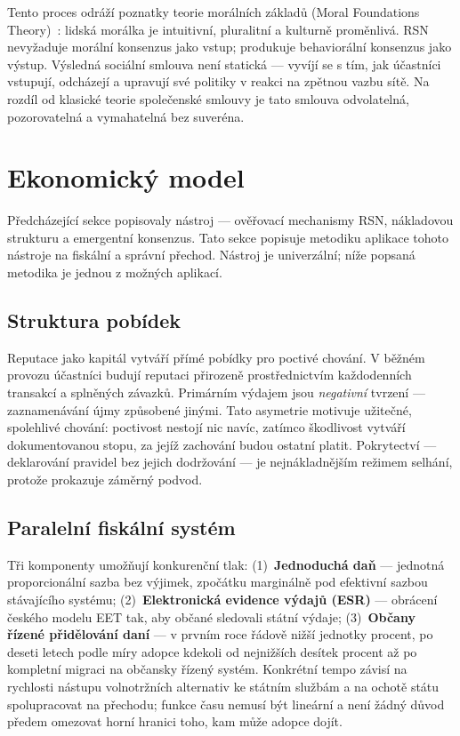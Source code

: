 \documentclass[11pt,a4paper,twocolumn]{article}
\begin{document}
Tento proces odráží poznatky teorie morálních základů (Moral Foundations Theory)~\cite{haidt2012}: lidská morálka je intuitivní, pluralitní a kulturně proměnlivá. RSN nevyžaduje morální konsenzus jako vstup; produkuje behaviorální konsenzus jako výstup. Výsledná sociální smlouva není statická --- vyvíjí se s tím, jak účastníci vstupují, odcházejí a upravují své politiky v reakci na zpětnou vazbu sítě. Na rozdíl od klasické teorie společenské smlouvy je tato smlouva odvolatelná, pozorovatelná a vymahatelná bez suveréna.

\section{Ekonomický model}

Předcházející sekce popisovaly nástroj --- ověřovací mechanismy RSN, nákladovou strukturu a emergentní konsenzus. Tato sekce popisuje metodiku aplikace tohoto nástroje na fiskální a správní přechod. Nástroj je univerzální; níže popsaná metodika je jednou z možných aplikací.

\subsection{Struktura pobídek}

Reputace jako kapitál vytváří přímé pobídky pro poctivé chování. V běžném provozu účastníci budují reputaci přirozeně prostřednictvím každodenních transakcí a splněných závazků. Primárním výdajem jsou \emph{negativní} tvrzení --- zaznamenávání újmy způsobené jinými. Tato asymetrie motivuje užitečné, spolehlivé chování: poctivost nestojí nic navíc, zatímco škodlivost vytváří dokumentovanou stopu, za jejíž zachování budou ostatní platit. Pokrytectví --- deklarování pravidel bez jejich dodržování --- je nejnákladnějším režimem selhání, protože prokazuje záměrný podvod.

\subsection{Paralelní fiskální systém}

Tři komponenty umožňují konkurenční tlak: (1)~\textbf{Jednoduchá daň} --- jednotná proporcionální sazba bez výjimek, zpočátku marginálně pod efektivní sazbou stávajícího systému; (2)~\textbf{Elektronická evidence výdajů (ESR)} --- obrácení českého modelu EET tak, aby občané sledovali státní výdaje; (3)~\textbf{Občany řízené přidělování daní} --- v prvním roce řádově nižší jednotky procent, po deseti letech podle míry adopce kdekoli od nejnižších desítek procent až po kompletní migraci na občansky řízený systém. Konkrétní tempo závisí na rychlosti nástupu volnotržních alternativ ke státním službám a na ochotě státu spolupracovat na přechodu; funkce času nemusí být lineární a není žádný důvod předem omezovat horní hranici toho, kam může adopce dojít.
\end{document}
